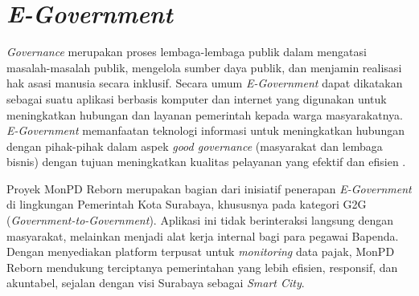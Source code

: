 \section{\emph{E-Government}}
\label{sec:e-government}

\emph{Governance} merupakan proses lembaga-lembaga publik dalam mengatasi masalah-masalah publik, mengelola sumber daya publik, dan menjamin realisasi hak asasi manusia secara inklusif. Secara umum \emph{E-Government} dapat dikatakan sebagai suatu aplikasi berbasis komputer dan internet yang digunakan untuk meningkatkan hubungan dan layanan pemerintah kepada warga masyarakatnya. \emph{E-Government} memanfaatan teknologi informasi untuk meningkatkan hubungan dengan pihak-pihak dalam aspek \emph{good governance} (masyarakat dan lembaga bisnis) dengan tujuan meningkatkan kualitas pelayanan yang efektif dan efisien \cite{muliawaty2020egov}.

Proyek MonPD Reborn merupakan bagian dari inisiatif penerapan \emph{E-Government} di lingkungan Pemerintah Kota Surabaya, khususnya pada kategori G2G (\emph{Government-to-Government}). Aplikasi ini tidak berinteraksi langsung dengan masyarakat, melainkan menjadi alat kerja internal bagi para pegawai Bapenda. Dengan menyediakan platform terpusat untuk \emph{monitoring} data pajak, MonPD Reborn mendukung terciptanya pemerintahan yang lebih efisien, responsif, dan akuntabel, sejalan dengan visi Surabaya sebagai \emph{Smart City}.
